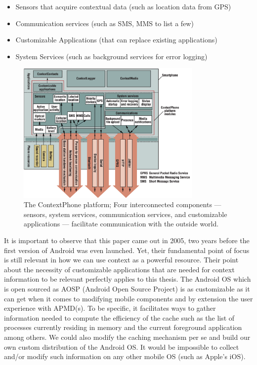 \documentclass[12pt]{uthesis-v12}  %
\begin{document}
		\begin{itemize}
			\item Sensors that acquire contextual data (such as location data from GPS)
			\item Communication services (such as SMS, MMS to list a few)
			\item Customizable Applications (that can replace existing applications)
			\item System Services (such as background services for error logging)
		\end{itemize}
		
		
		\begin{figure}[!ht]
			\centering
			\includegraphics[width = 90mm]{images/contextPhone.png}
			\caption[Context Phone]
			{The ContextPhone platform; Four interconnected components — sensors, system services, communication services, and customizable applications — facilitate communication with the outside world.}
		\end{figure}
		
		It is important to observe that this paper came out in 2005, two years before the first version of Android was even launched. Yet, their fundamental point of focus is still relevant in how we can use context as a powerful resource. Their point about the necessity of customizable applications that are needed for context information to be relevant perfectly applies to this thesis. The Android OS which is open sourced as AOSP (Android Open Source Project) is as customizable as it can get when it comes to modifying mobile components and by extension the user experience with APMD(s). To be specific, it facilitates ways to gather information needed to compute the efficiency of the cache such as the list of processes currently residing in memory and the current foreground application among others. We could also modify the caching mechanism per se and build our own custom distribution of the Android OS. It would be impossible to collect and/or modify such information on any other mobile OS (such as Apple's iOS).
		
\end{document}
